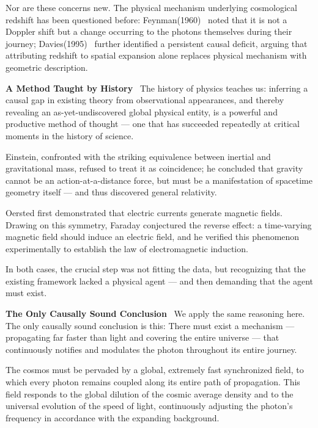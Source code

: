 \documentclass[12pt,leqno]{article}
\begin{document}
{	\medskip
	Nor are these concerns new. The physical mechanism underlying cosmological redshift has been questioned before: Feynman(1960)~\cite{Feynman:2011} noted that it is not a Doppler shift but a change occurring to the photons themselves during their journey; Davies(1995)~\cite{Davies:1995} further identified a persistent causal deficit, arguing that attributing redshift to spatial expansion alone replaces physical mechanism with geometric description. 
	
	\medskip
	\bigskip
	\textbf{A Method Taught by History}\,\,\,
	The history of physics teaches us: inferring a causal gap in existing theory from observational appearances, and thereby revealing an as-yet-undiscovered global physical entity, is a powerful and productive method of thought — one that has succeeded repeatedly at critical moments in the history of science.
	
	\medskip
	Einstein, confronted with the striking equivalence between inertial and gravitational mass, refused to treat it as coincidence; he concluded that gravity cannot be an action-at-a-distance force, but must be a manifestation of spacetime geometry itself — and thus discovered general relativity. 
	
	\medskip
	Oersted first demonstrated that electric currents generate magnetic fields. Drawing on this symmetry, Faraday conjectured the reverse effect: a time-varying magnetic field should induce an electric field, and he verified this phenomenon experimentally to establish the law of electromagnetic induction.
	
	\medskip
	In both cases, the crucial step was not fitting the data, but recognizing that the existing framework lacked a physical agent — and then demanding that the agent must exist.
	
	
	
	\medskip
	\bigskip
	\textbf{The Only Causally Sound Conclusion}\,\,\,
	We apply the same reasoning here. The only causally sound conclusion is this: There must exist a mechanism — propagating far faster than light and covering the entire universe — that continuously notifies and modulates the photon throughout its entire journey. 
	
	\medskip
	The cosmos must be pervaded by a global, extremely fast synchronized field, to which every photon remains coupled along its entire path of propagation. This field responds to the global dilution of the cosmic average density and to the universal evolution of the speed of light, continuously adjusting the photon's frequency in accordance with the expanding background.
	
}
\end{document}
